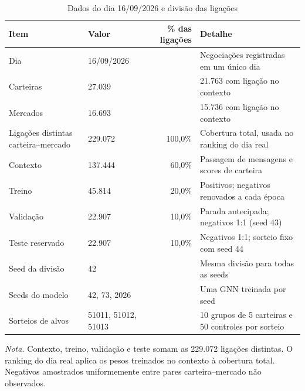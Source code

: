 \begin{table}[htbp]
\centering
\small
\caption{Dados do dia 16/09/2026 e divisão das ligações}
\label{tab:t1}
\begin{tabular}{llrl}
\toprule
\textbf{Item} & \textbf{Valor} & \textbf{\% das ligações} & \textbf{Detalhe} \\
\midrule
Dia & 16/09/2026 &  & Negociações registradas em um único dia \\
Carteiras & 27.039 &  & 21.763 com ligação no contexto \\
Mercados & 16.693 &  & 15.736 com ligação no contexto \\
Ligações distintas carteira–mercado & 229.072 & 100,0\% & Cobertura total, usada no ranking do dia real \\
\midrule
Contexto & 137.444 & 60,0\% & Passagem de mensagens e scores de carteira \\
Treino & 45.814 & 20,0\% & Positivos; negativos renovados a cada época \\
Validação & 22.907 & 10,0\% & Parada antecipada; negativos 1:1 (seed 43) \\
Teste reservado & 22.907 & 10,0\% & Negativos 1:1; sorteio fixo com seed 44 \\
\midrule
Seed da divisão & 42 &  & Mesma divisão para todas as seeds \\
Seeds do modelo & 42, 73, 2026 &  & Uma GNN treinada por seed \\
Sorteios de alvos & 51011, 51012, 51013 &  & 10 grupos de 5 carteiras e 50 controles por sorteio \\
\bottomrule
\end{tabular}
\par\smallskip\parbox{\linewidth}{\scriptsize\textit{Nota.} Contexto, treino, validação e teste somam as 229.072 ligações distintas. O ranking do dia real aplica os pesos treinados no contexto à cobertura total. Negativos amostrados uniformemente entre pares carteira–mercado não observados.}
\end{table}
